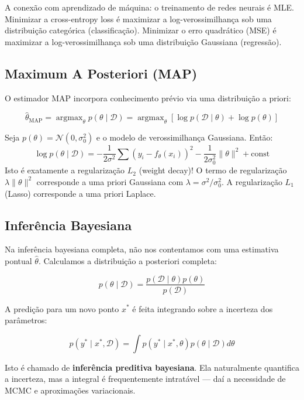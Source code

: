 \documentclass{tufte-handout}
\DeclareMathOperator*{\argmax}{argmax}
\begin{document}
A conexão com aprendizado de máquina: o treinamento de redes neurais é MLE.
Minimizar a cross-entropy loss é maximizar a log-verossimilhança sob uma distribuição
categórica (classificação). Minimizar o erro quadrático (MSE) é maximizar a
log-verossimilhança sob uma distribuição Gaussiana (regressão).

\subsection{Maximum A Posteriori (MAP)}

O estimador MAP incorpora conhecimento prévio via uma distribuição a priori:

\[
\hat{\theta}_{\text{MAP}} = \argmax_\theta p(\theta \mid \mathcal{D}) = \argmax_\theta \left[\log p(\mathcal{D} \mid \theta) + \log p(\theta) \right]
\]

\begin{exmp}
    Seja $p(\theta) = \mathcal{N}(0, \sigma_0^2)$ e o modelo de verossimilhança Gaussiana.
    Então:
    \[
    \log p(\theta \mid \mathcal{D}) = -\frac{1}{2\sigma^2}\sum (y_i - f_\theta(x_i))^2 - \frac{1}{2\sigma_0^2}\|\theta\|^2 + \text{const}
    \]
    Isto é exatamente a regularização $L_2$ (weight decay)! O termo de regularização
    $\lambda\|\theta\|^2$ corresponde a uma priori Gaussiana com $\lambda = \sigma^2/\sigma_0^2$.
    A regularização $L_1$ (Lasso) corresponde a uma priori Laplace.
\end{exmp}

\subsection{Inferência Bayesiana}
\label{sec:bayesian}

Na inferência bayesiana completa, não nos contentamos com uma estimativa pontual
$\hat{\theta}$. Calculamos a distribuição a posteriori completa:

\[
p(\theta \mid \mathcal{D}) = \frac{p(\mathcal{D} \mid \theta) p(\theta)}{p(\mathcal{D})}
\]

A predição para um novo ponto $x^*$ é feita integrando sobre a incerteza dos parâmetros:

\[
p(y^* \mid x^*, \mathcal{D}) = \int p(y^* \mid x^*, \theta) p(\theta \mid \mathcal{D}) d\theta
\]

Isto é chamado de \textbf{inferência preditiva bayesiana}. Ela naturalmente quantifica
a incerteza, mas a integral é frequentemente intratável --- daí a necessidade de MCMC
e aproximações variacionais.
\end{document}
